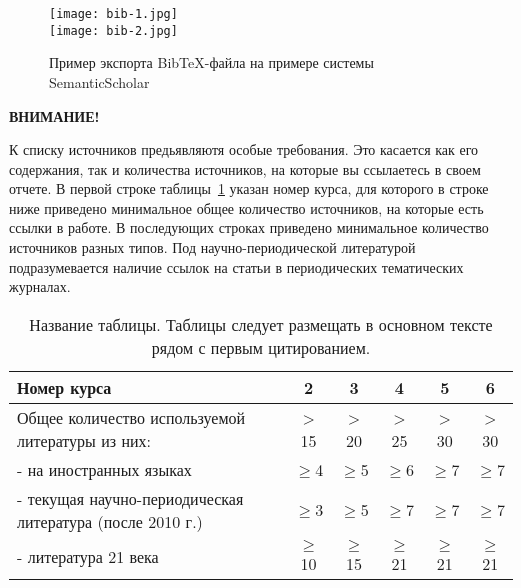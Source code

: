 \begin{figure}[h!]
\begin{center}
\texttt{[image: bib-1.jpg]}\\[2mm]
\texttt{[image: bib-2.jpg]}\\[2mm]
\caption{Пример экспорта Bib\TeX-файла на примере системы SemanticScholar}\label{fig:BibTex}
\end{center}
\end{figure}

\newpage
\textbf{ВНИМАНИЕ!}

К списку источников предьявляютя особые требования. Это касается как его
содержания, так и количества источников, на которые вы ссылаетесь в своем
отчете. В первой строке таблицы~\ref{tab:lit} указан номер курса, для
которого в строке ниже приведено минимальное общее количество источников,
на которые есть ссылки в работе. В последующих строках приведено минимальное
количество источников разных типов. Под научно-периодической литературой
подразумевается наличие ссылок на статьи в периодических тематических журналах.

\begin{table}[h]
\caption{Название таблицы. Таблицы следует размещать в основном тексте рядом с первым цитированием.}
\label{tab:lit}
\begin{center}
\begin{tabular}{|p{7.5 cm}|c|c|c|c|c|}
\hline
 Номер курса & 2 & 3 & 4 & 5 & 6\\
\hline
Общее количество используемой литературы из них: & > 15 & > 20 & > 25 & > 30 & > 30 \\
\hline
- на иностранных языках & $\ge$4 & $\ge$5 & $\ge$6 & $\ge$7 & $\ge$7 \\
\hline
- текущая научно-периодическая литература (после 2010 г.)& $\ge$3 & $\ge$5 & $\ge$7 & $\ge$7 & $\ge$7  \\
\hline
- литература 21 века & $\ge$10 & $\ge$15 & $\ge$21 & $\ge$21 & $\ge$21 \\
\hline
\end{tabular}
\end{center}
\end{table}
